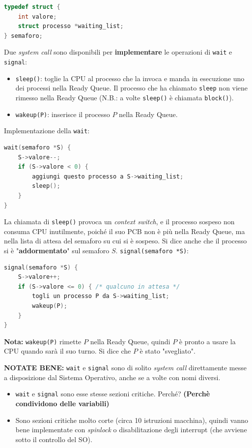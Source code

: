 \begin{lstlisting}[language=C]
typedef struct {
    int valore;
    struct processo *waiting_list;
} semaforo;
\end{lstlisting}
Due \textit{system call} sono disponibili per \textbf{implementare} le operazioni di \texttt{wait} e \texttt{signal}:
\begin{itemize}
    \item \texttt{sleep()}: toglie la CPU al processo che la invoca e manda in esecuzione uno dei processi nella Ready Queue. Il processo che ha chiamato \texttt{sleep} non viene rimesso nella Ready Queue (N.B.: a volte \texttt{sleep()} è chiamata \texttt{block()}).
    \item \texttt{wakeup(P)}: inserisce il processo $P$ nella Ready Queue.
\end{itemize}
Implementazione della \texttt{wait}:
\begin{lstlisting}[language=C]
wait(semaforo *S) {
    S->valore--;
    if (S->valore < 0) {
        aggiungi questo processo a S->waiting_list;
        sleep();
    }
}
\end{lstlisting}
La chiamata di \texttt{sleep()} provoca un \textit{context switch}, e il processo sospeso non consuma CPU inutilmente, poiché il suo PCB non è più nella Ready Queue, ma nella lista di attesa del semaforo su cui si è sospeso.
Si dice anche che il processo si è "\textbf{addormentato}" sul semaforo $S$.
\texttt{signal(semaforo *S)}:
\begin{lstlisting}[language=C]
signal(semaforo *S) {
    S->valore++;
    if (S->valore <= 0) { /* qualcuno in attesa */
        togli un processo P da S->waiting_list;
        wakeup(P);
    }
}
\end{lstlisting}

\textbf{Nota:} \texttt{wakeup(P)} rimette $P$ nella Ready Queue, quindi $P$ è pronto a usare la CPU quando sarà il suo turno. Si dice che $P$ è stato "svegliato".

\textbf{NOTATE BENE:} \texttt{wait} e \texttt{signal} sono di solito \textit{system call} direttamente messe a disposizione dal Sistema Operativo, anche se a volte con nomi diversi.
\begin{itemize}
    \item \texttt{wait} e \texttt{signal} sono esse stesse sezioni critiche. Perché? \textbf{(Perchè condividono delle variabili)}
    \item Sono sezioni critiche molto corte (circa 10 istruzioni macchina), quindi vanno bene implementate con \textit{spinlock} o disabilitazione degli interrupt (che avviene sotto il controllo del SO).
\end{itemize}

